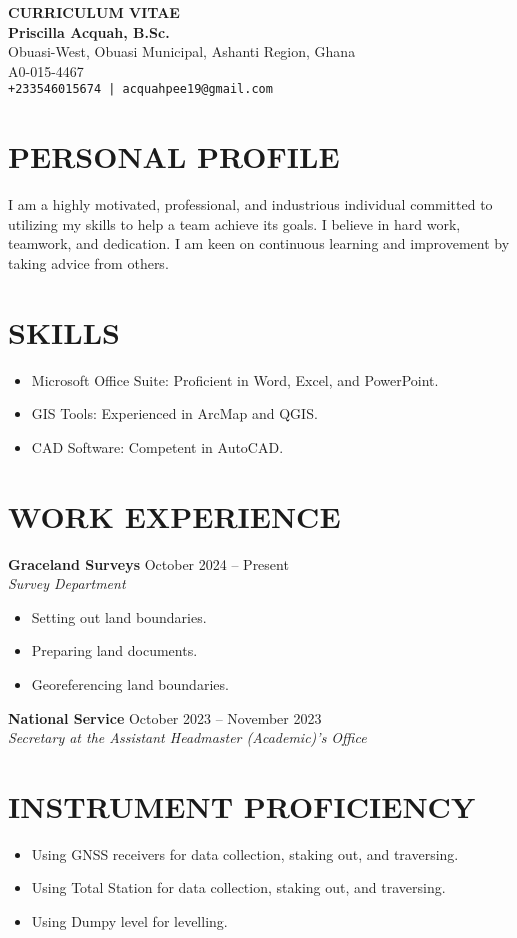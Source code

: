 \documentclass[a4paper,10pt]{article}
\begin{document}
\begin{center}
    {\LARGE \textbf{CURRICULUM VITAE}} \\[0.5cm]
    \textbf{Priscilla Acquah, B.Sc.} \\
    Obuasi-West, Obuasi Municipal, Ashanti Region, Ghana \\
    A0-015-4467 \\
    \texttt{+233546015674 | acquahpee19@gmail.com} 
\end{center}

\section*{PERSONAL PROFILE}
I am a highly motivated, professional, and industrious individual committed to utilizing my skills to help a team achieve its goals. I believe in hard work, teamwork, and dedication. I am keen on continuous learning and improvement by taking advice from others.

\section*{SKILLS}
\begin{itemize}
    \item Microsoft Office Suite: Proficient in Word, Excel, and PowerPoint.
    \item GIS Tools: Experienced in ArcMap and QGIS.
    \item CAD Software: Competent in AutoCAD.
\end{itemize}

\section*{WORK EXPERIENCE}
\textbf{Graceland Surveys} \hfill October 2024 – Present \\
\textit{Survey Department}
\begin{itemize}
    \item Setting out land boundaries.
    \item Preparing land documents.
    \item Georeferencing land boundaries.
\end{itemize}

\textbf{National Service} \hfill October 2023 – November 2023 \\
\textit{Secretary at the Assistant Headmaster (Academic)’s Office}

\section*{INSTRUMENT PROFICIENCY}
\begin{itemize}
    \item Using GNSS receivers for data collection, staking out, and traversing.
    \item Using Total Station for data collection, staking out, and traversing.
    \item Using Dumpy level for levelling.
\end{itemize}
\end{document}
